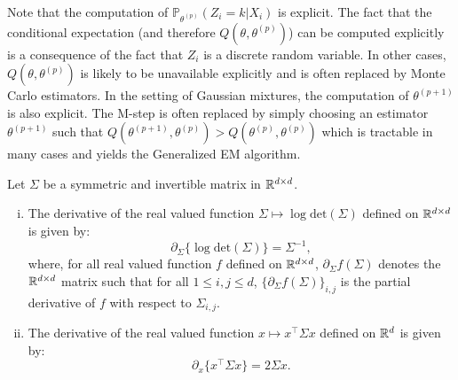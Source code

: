 \documentclass[english,graybox,envcountchap,envcountsame,sectrefs,shortlabels]{svmono}
\theoremstyle{style}
\newcommand{\eqsp}{}
\begin{document}
\begin{remark}
Note that the computation of $\mathbb{P}_{\theta^{(p)}}(Z_i = k|X_i) $ is explicit. The fact that the conditional expectation (and therefore $Q(\theta,\theta^{(p)})$) can be computed explicitly is a consequence of the fact that $Z_i$ is a discrete random variable. In other cases, $Q(\theta,\theta^{(p)})$ is likely to be unavailable explicitly and is often replaced by Monte Carlo estimators. In the setting of Gaussian mixtures, the computation of $\theta^{(p+1)}$ is also explicit. The M-step is often replaced by simply choosing an estimator $\theta^{(p+1)}$ such that $Q(\theta^{(p+1)},\theta^{(p)}) > Q(\theta^{(p)},\theta^{(p)})$  which is tractable in many cases and yields the Generalized EM algorithm.
\end{remark}

\begin{lemma}
\label{lem:matrix:calculus}
Let $\Sigma$ be a symmetric and invertible  matrix in $\mathbb{R}^{d\times d}$.
\begin{enumerate}[(i)]
\item The derivative of the real valued function $\Sigma \mapsto \log\mathrm{det}(\Sigma)$ defined on $\mathbb{R}^{d\times d}$ is given by:
\[
\partial_{\Sigma}\{\log\mathrm{det}(\Sigma)\}= \Sigma^{-1}\eqsp,
\]
where, for all real valued function $f$ defined on $\mathbb{R}^{d\times d}$, $\partial_{\Sigma}f(\Sigma)$ denotes the $\mathbb{R}^{d\times d}$ matrix such that for all $1\leqslant i,j\leqslant d$, $\{\partial_{\Sigma}f(\Sigma)\}_{i,j}$ is the partial derivative of $f$ with respect to $\Sigma_{i,j}$.
\item The derivative of the real valued  function  $x\mapsto x^\top\Sigma x$ defined on $\mathbb{R}^d$ is given by:
\[
\partial_{x}\{x^\top\Sigma x\} = 2 \Sigma x\eqsp.
\]
\end{enumerate}
\end{lemma}
\end{document}
